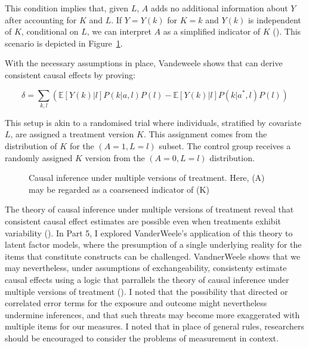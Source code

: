 \documentclass[
  singlecolumn,
  9pt]{article}
\begin{document}
This condition implies that, given \(L\), \(A\) adds no additional
information about \(Y\) after accounting for \(K\) and \(L\). If
\(Y = Y(k)\) for \(K = k\) and \(Y(k)\) is independent of \(K\),
conditional on \(L\), we can interpret \(A\) as a simplified indicator
of \(K\) ().
This scenario is depicted in
Figure~\ref{fig-dag-multiple-version-treatment-dag}.

With the necessary assumptions in place, Vandeweele shows that can
derive consistent causal effects by proving:

\[\delta = \sum_{k,l} \left( \mathbb{E}[Y(k)|l] P(k|a,l) P(l) - \mathbb{E}[Y(k)|l] P(k|a^*,l) P(l) \right) \]

This setup is akin to a randomised trial where individuals, stratified
by covariate \(L\), are assigned a treatment version \(K\). This
assignment comes from the distribution of \(K\) for the
\((A = 1, L = l)\) subset. The control group receives a randomly
assigned \(K\) version from the \((A = 0, L = l)\) distribution.

\begin{figure}


\caption{\label{fig-dag-multiple-version-treatment-dag}Causal inference
under multiple versions of treatment. Here, (A) may be regarded as a
coarseneed indicator of (K)}

\end{figure}%

The theory of causal inference under multiple versions of treatment
reveal that consistent causal effect estimates are possible even when
treatments exhibit variability
(). In Part
5, I explored VanderWeele's application of this theory to latent factor
models, where the presumption of a single underlying reality for the
items that constitute constructs can be challenged. VandnerWeele shows
that we may nevertheless, under assumptions of exchangeability,
consistenty estimate causal effects using a logic that parrallels the
theory of causal inference under multiple versions of treatment
(). I noted that the
possibility that directed or correlated error terms for the exposure and
outcome might nevertheless undermine inferences, and that such threats
may become more exaggerated with multiple items for our measures. I
noted that in place of general rules, researchers should be encouraged
to consider the problems of measurement in context.
\end{document}
